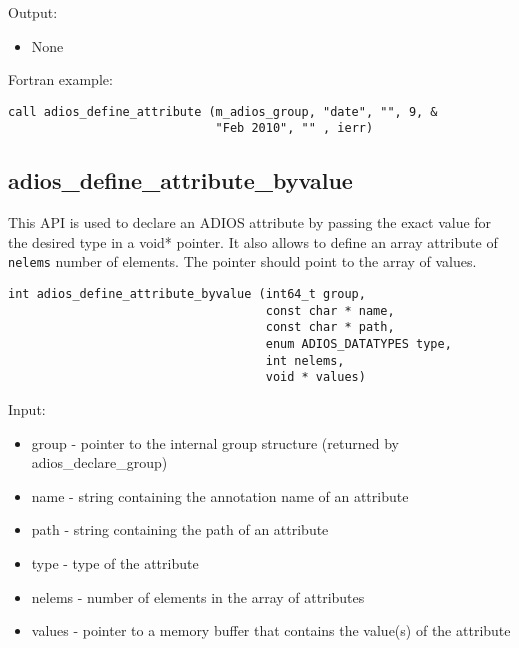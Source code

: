 Output:
\begin{itemize}
\item None
\end{itemize}

Fortran example: 
\begin{lstlisting}[alsolanguage=Fortran,caption={},label={}]
call adios_define_attribute (m_adios_group, "date", "", 9, &
                             "Feb 2010", "" , ierr)
\end{lstlisting}


\subsection{adios\_define\_attribute\_byvalue}
\label{section-define-attribute-byvalue}

This API is used to declare an ADIOS attribute by passing the exact value for the desired type in a void* pointer. It also allows to define an array attribute of \verb+nelems+ number of elements. The pointer should point to the array of values. 

\begin{lstlisting}[alsolanguage=C,caption={},label={}]
int adios_define_attribute_byvalue (int64_t group,
                                    const char * name, 
                                    const char * path,
                                    enum ADIOS_DATATYPES type,
                                    int nelems,
                                    void * values)
\end{lstlisting}

Input:
\begin{itemize}
\item group - pointer to the internal group structure (returned by adios\_declare\_group)

\item name - string containing the annotation name of an attribute

\item path - string containing the path of an attribute

\item type  - type of the attribute

\item nelems - number of elements in the array of attributes 

\item values - pointer to a memory buffer that contains the value(s) of the attribute
 
\end{itemize}

